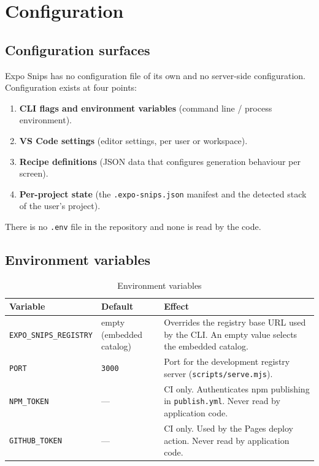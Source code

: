 \chapter{Configuration}
\label{ch:configuration}

\section{Configuration surfaces}

Expo Snips has no configuration file of its own and no server-side
configuration. Configuration exists at four points:

\begin{enumerate}
  \item \textbf{CLI flags and environment variables} (command line / process
        environment).
  \item \textbf{VS Code settings} (editor settings, per user or workspace).
  \item \textbf{Recipe definitions} (JSON data that configures generation
        behaviour per screen).
  \item \textbf{Per-project state} (the \texttt{.expo-snips.json} manifest and
        the detected stack of the user's project).
\end{enumerate}

There is no \texttt{.env} file in the repository and none is read by the code.

\section{Environment variables}

\begin{longtable}{p{4.4cm}p{2.2cm}p{7.6cm}}
\caption{Environment variables}\\
\toprule
\textbf{Variable} & \textbf{Default} & \textbf{Effect} \\
\midrule

\texttt{EXPO\_SNIPS\_REGISTRY} & empty (embedded catalog) & Overrides the
registry base URL used by the CLI. An empty value selects the embedded catalog. \\
\texttt{PORT} & \texttt{3000} & Port for the development registry server
(\texttt{scripts/serve.mjs}). \\
\texttt{NPM\_TOKEN} & --- & CI only. Authenticates npm publishing in
\texttt{publish.yml}. Never read by application code. \\
\texttt{GITHUB\_TOKEN} & --- & CI only. Used by the Pages deploy action. Never
read by application code. \\
\bottomrule
\end{longtable}

